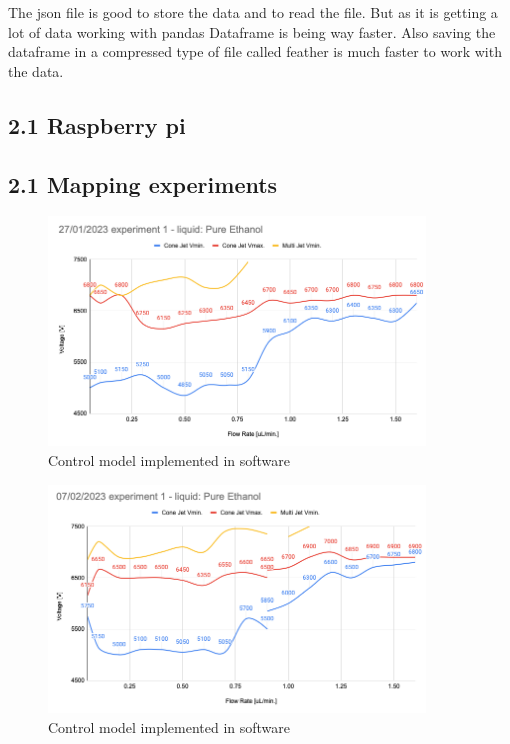     The json file is good to store the data and to read the file. But as it is getting a lot of data working with pandas Dataframe is being way faster. Also saving the dataframe in a compressed
    type of file called feather is much faster to work with the data.


\subsection*{2.1 Raspberry pi}


\subsection*{2.1 Mapping experiments}



    \begin{figure}[H]
        \center
        \includegraphics[width=10cm]{images/image_folder_report_4/manualMap1.png}
        \caption{Control model implemented in software}
    \end{figure}

    \begin{figure}[H]
        \center
        \includegraphics[width=10cm]{images/image_folder_report_4/manualMap2.png}
        \caption{Control model implemented in software}
    \end{figure}

